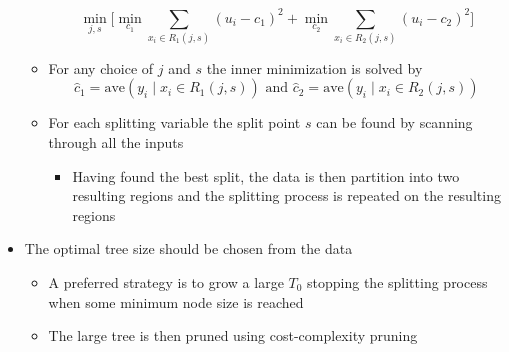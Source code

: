\documentclass[a4, english]{article}
\begin{document}
\begin{itemize}
\begin{itemize}
\begin{equation*}
  \min_{j,s} \bigg[\min_{c_1}\sum_{x_i \in R_1(j,s)}(u_i-c_1)^2 + \min_{c_2}\sum_{x_i \in R_2(j,s)}(u_i-c_2)^2\bigg]
\end{equation*}
    \item For any choice of $j$ and $s$ the inner minimization is solved by
\begin{equation*}
  \hat c_1 =  \text{ave}(y_i \mid x_i \in R_1(j,s)) \text{ and } \hat c_2 =  \text{ave}(y_i \mid x_i \in R_2(j,s))
\end{equation*}
    \item For each splitting variable the split point $s$ can be found by scanning through all the inputs 
    \begin{itemize}
  	  \item Having found the best split, the data is then partition into two resulting regions and the splitting process is repeated on the resulting regions
    \end{itemize}
  \end{itemize}
  \item The optimal tree size should be chosen from the data 
  \begin{itemize}
  	\item A preferred strategy is to grow a large $T_0$ stopping the splitting process when some minimum node size is reached
    \item The large tree is then pruned using cost-complexity pruning
  \end{itemize}
\end{itemize}
\end{document}
